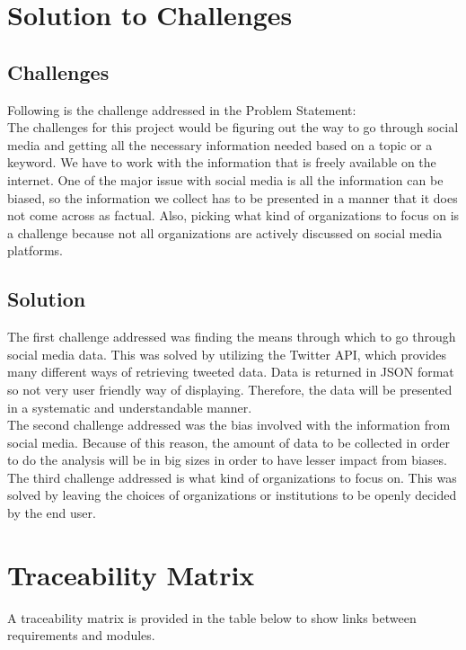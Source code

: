 \documentclass[12pt, titlepage]{article}
\begin{document}
\section{Solution to Challenges}
\subsection{Challenges}
Following is the challenge addressed in the Problem Statement:\\
The challenges for this project would be figuring out the way to go through social media and getting all the necessary information needed based on a topic or a keyword. We have to work with the information that is freely available on the internet. One of the major issue with social media is all the information can be biased, so the information we collect has to be presented in a manner that it does not come across as factual. Also, picking what kind of organizations to focus on is a challenge because not all organizations are actively discussed on social media platforms.\\
\subsection{Solution}
The first challenge addressed was finding the means through which to go through social media data. This was solved by utilizing the Twitter API, which provides many different ways of retrieving tweeted data. Data is returned in JSON format so not very user friendly way of displaying. Therefore, the data will be presented in a systematic and understandable manner.\\
The second challenge addressed was the bias involved with the information from social media. Because of this reason, the amount of data to be collected in order to do the analysis will be in big sizes in order to have lesser impact from biases. \\
The third challenge addressed is what kind of organizations to focus on. This was solved by leaving the choices of organizations or institutions to be openly decided by the end user. 


\section{Traceability Matrix}
A traceability matrix is provided in the table below to show links between requirements and modules.
\end{document}
